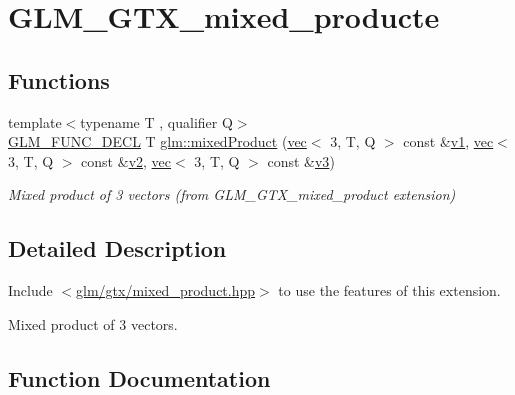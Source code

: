 \hypertarget{group__gtx__mixed__product}{}\section{G\+L\+M\+\_\+\+G\+T\+X\+\_\+mixed\+\_\+producte}
\label{group__gtx__mixed__product}
\subsection*{Functions}
\begin{DoxyCompactItemize}
\item 
{\footnotesize template$<$typename T , qualifier Q$>$ }\\\hyperlink{setup_8hpp_ab2d052de21a70539923e9bcbf6e83a51}{G\+L\+M\+\_\+\+F\+U\+N\+C\+\_\+\+D\+E\+CL} T \hyperlink{group__gtx__mixed__product_gab3c6048fbb67f7243b088a4fee48d020}{glm\+::mixed\+Product} (\hyperlink{structglm_1_1vec}{vec}$<$ 3, T, Q $>$ const \&\hyperlink{_s_d_l__opengl__glext_8h_a435c176a02c061b43e19bdf7c86cceae}{v1}, \hyperlink{structglm_1_1vec}{vec}$<$ 3, T, Q $>$ const \&\hyperlink{_s_d_l__opengl__glext_8h_a0928f6d0f0f794ba000a21dfae422136}{v2}, \hyperlink{structglm_1_1vec}{vec}$<$ 3, T, Q $>$ const \&\hyperlink{_s_d_l__opengl__glext_8h_acc806b31cbf466ceba6555983d8b814d}{v3})
\begin{DoxyCompactList}\small\item\em Mixed product of 3 vectors (from G\+L\+M\+\_\+\+G\+T\+X\+\_\+mixed\+\_\+product extension) \end{DoxyCompactList}\end{DoxyCompactItemize}


\subsection{Detailed Description}
Include $<$\hyperlink{mixed__product_8hpp}{glm/gtx/mixed\+\_\+product.\+hpp}$>$ to use the features of this extension.

Mixed product of 3 vectors. 

\subsection{Function Documentation}
\mbox{\label{group__gtx__mixed__product_gab3c6048fbb67f7243b088a4fee48d020}} 
